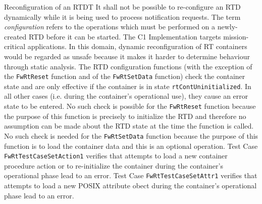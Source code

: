 \documentclass[requirements]{../fwprofile}
\begin{document}
\begin{fw_req_note}{Reconfiguration of an RTD}{T}
{It shall not be possible to re-configure an RTD dynamically while it is being used to process notification requests.}
{The term \textit{configuration} refers to the operations which must be performed on a newly-created RTD before it can be started.}
{ The C1 Implementation targets mission-critical applications. In this domain, dynamic reconfiguration of RT containers would be regarded as unsafe because it makes it harder to determine behaviour through static analysis.}
{ The RTD configuration functions (with the exception of the \texttt{FwRtReset} function and of the \texttt{FwRtSetData} function) check the container state and are only effective if the container is in state \texttt{rtContUninitialized}. In all other cases (i.e. during the container's operational use), they cause an error state to be entered. No such check is possible for the \texttt{FwRtReset} function because the purpose of this function is precisely to initialize the RTD and therefore no assumption can be made about the RTD state at the time the function is called. No such check is needed for the \texttt{FwRtSetData} function because the purpose of this function is to load the container data and this is an optional operation.  } 
{ Test Case \texttt{FwRtTestCaseSetAction1} verifies that attempts to load a new container procedure action or to re-initialize the container during the container's operational phase lead to an error. Test Case \texttt{FwRtTestCaseSetAttr1} verifies that attempts to load a new POSIX attribute obect during the container's operational phase lead to an error.}
\end{fw_req_note}
\end{document}
